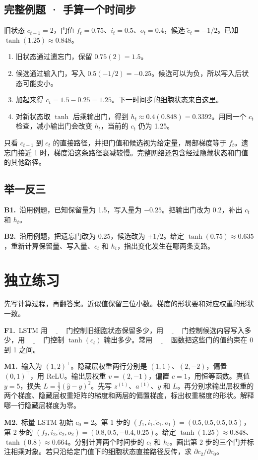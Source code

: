 \documentclass[UTF8,a4paper,11pt]{ctexart}
\newcommand{\PracticeQuestion}[3]{\par\Needspace{4\baselineskip}\noindent\begin{minipage}{\linewidth}\textbf{#1.}\ #2\par\noindent\rule{0pt}{#3mm}\par\end{minipage}\par}
\begin{document}
\subsection{完整例题 · 手算一个时间步}
旧状态 $c_{t-1}=2$，门值 $f_t=0.75$、$i_t=0.5$、$o_t=0.4$，候选 $\tilde c_t=-1/2$。已知 $\tanh(1.25)\approx0.848$。

\begin{enumerate}
\item 旧状态通过遗忘门，保留 $0.75(2)=1.5$。
\item 候选通过输入门，写入 $0.5(-1/2)=-0.25$。候选可以为负，所以写入后状态可能变小。
\item 加起来得 $c_t=1.5-0.25=1.25$。下一时间步的细胞状态来自这里。
\item 对新状态取 $\tanh$ 后乘输出门，得到 $h_t\approx0.4(0.848)=0.3392$。用同一个 $c_t$ 检查，减小输出门会改变 $h_t$，当前的 $c_t$ 仍为 1.25。
\end{enumerate}
只看 $c_{t-1}$ 到 $c_t$ 的直接路径，并把门值和候选视为给定量，局部梯度等于 $f_t$。遗忘门接近 1 时，梯度沿这条路径衰减较慢。完整网络还包含经过隐藏状态和门值的其他路径。

\subsection{举一反三}
\PracticeQuestion{B1}{沿用例题，已知保留量为 1.5，写入量为 $-0.25$。把输出门改为 $0.2$，补出 $c_t$ 和 $h_t$。}{13}
\PracticeQuestion{B2}{沿用例题，把遗忘门改为 $0.25$，候选改为 $+1/2$。给定 $\tanh(0.75)\approx0.635$，重新计算保留量、写入量、$c_t$ 和 $h_t$，指出变化发生在哪两条支路。}{23}
\clearpage
\section{独立练习}
先写计算过程，再翻答案。近似值保留三位小数。梯度的形状要和对应权重的形状一致。

\PracticeQuestion{F1}{LSTM 用 $\underline{\qquad}$ 门控制旧细胞状态保留多少，用 $\underline{\qquad}$ 门控制候选内容写入多少，用 $\underline{\qquad}$ 门控制 $\tanh(c_t)$ 输出多少。常用 $\underline{\qquad}$ 函数把这些门的值约束在 0 到 1 之间。}{12}
\PracticeQuestion{M1}{输入为 $(1,2)^\top$。隐藏层权重两行分别是 $(1,1)$、$(2,-2)$，偏置 $(0,1)^\top$，用 ReLU。输出层权重 $v=(2,-1)$，偏置 $c=1$，用恒等函数。真值 $y=5$，损失 $L=\tfrac12(\hat y-y)^2$。先写 $z^{(1)}$、$a^{(1)}$、$\hat y$ 和 $L$。再分别求输出层权重的两个梯度、隐藏层权重矩阵的梯度和两层的偏置梯度，标出权重梯度的形状。解释哪一行隐藏层梯度为零。}{63}
\PracticeQuestion{M2}{标量 LSTM 初始 $c_0=2$。第 1 步的 $(f_1,i_1,\tilde c_1,o_1)=(0.5,0.5,0.5,0.5)$，第 2 步的 $(f_2,i_2,\tilde c_2,o_2)=(0.8,0.5,-0.4,0.25)$。给定 $\tanh(1.25)\approx0.848$、$\tanh(0.8)\approx0.664$。分别计算两个时间步的 $c_t$ 和 $h_t$。画出第 2 步的三个门并标注相乘对象。若只沿给定门值下的细胞状态直接路径反传，求 $\partial c_2/\partial c_0$。}{63}
\clearpage
\end{document}
